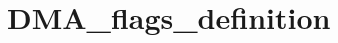 \hypertarget{group___d_m_a__flags__definition}{\section{D\-M\-A\-\_\-flags\-\_\-definition}
\label{group___d_m_a__flags__definition}
}
